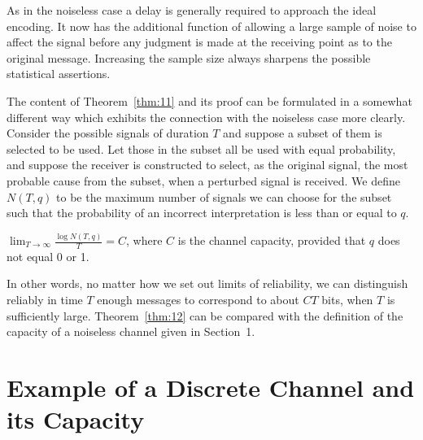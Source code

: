 As in the noiseless case a delay is generally required to approach the
ideal encoding.  It now has the additional function of allowing a large
sample of noise to affect the signal before any judgment is made at the
receiving point as to the original message.  Increasing the sample size
always sharpens the possible statistical assertions.

The content of Theorem~\ref{thm:11} and its proof can be formulated in a
somewhat different way which exhibits the connection with the noiseless
case more clearly.  Consider the possible signals of duration $T$
and suppose a subset of them is selected to be used.  Let those in the
subset all be used with equal probability, and suppose the receiver is
constructed to select, as the original signal, the most probable cause
from the subset, when a perturbed signal is received.  We define $N(T,q)$
to be the maximum number of signals we can choose for the subset such
that the probability of an incorrect interpretation is less than or
equal to $q$.

\begin{theorem}
\label{thm:12}
$\displaystyle\lim_{T \to \infty}\frac{\log N(T,q)}{T} = C$, where $C$
is the channel capacity, provided that $q$ does not equal 0 or 1.
\end{theorem}

In other words, no matter how we set out limits of reliability, we can
distinguish reliably in time $T$ enough messages to correspond to about
$CT$ bits, when $T$ is sufficiently large.  Theorem~\ref{thm:12} can
be compared with the definition of the capacity of a noiseless channel
given in Section~1.

\section{Example of a Discrete Channel and its Capacity}

